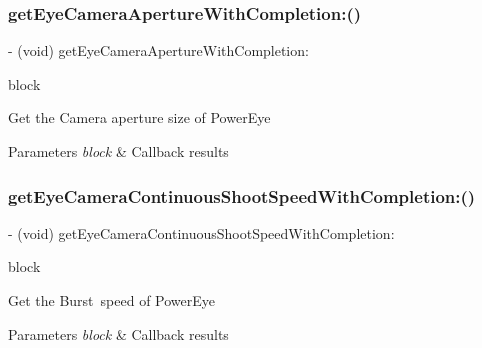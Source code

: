 \subsubsection{\texorpdfstring{get\+Eye\+Camera\+Aperture\+With\+Completion\+:()}{getEyeCameraApertureWithCompletion:()}}
{\footnotesize\ttfamily -\/ (void) get\+Eye\+Camera\+Aperture\+With\+Completion\+: \begin{DoxyParamCaption}\item[{(void($^\wedge$)(P\+V\+Eye\+Camera\+Aperture aperture, N\+S\+Error $\ast$\+\_\+\+Nullable error))}]{block }\end{DoxyParamCaption}}

Get the Camera aperture size of Power\+Eye


\begin{DoxyParams}{Parameters}
{\em block} & Callback results \\
\hline
\end{DoxyParams}
\mbox{\label{interface_p_v_eye_camera_ac7088cda01ca454c462eb3a7f459b482}} 
\subsubsection{\texorpdfstring{get\+Eye\+Camera\+Continuous\+Shoot\+Speed\+With\+Completion\+:()}{getEyeCameraContinuousShootSpeedWithCompletion:()}}
{\footnotesize\ttfamily -\/ (void) get\+Eye\+Camera\+Continuous\+Shoot\+Speed\+With\+Completion\+: \begin{DoxyParamCaption}\item[{(void($^\wedge$)(P\+V\+Eye\+Camera\+Continuous\+Shoot\+Speed shoot\+Speed, N\+S\+Error $\ast$\+\_\+\+Nullable error))}]{block }\end{DoxyParamCaption}}

Get the Burst speed of Power\+Eye


\begin{DoxyParams}{Parameters}
{\em block} & Callback results \\
\hline
\end{DoxyParams}
\mbox{\label{interface_p_v_eye_camera_a7f2b3144f0e9aa5757d07d8df99a7998}} 
